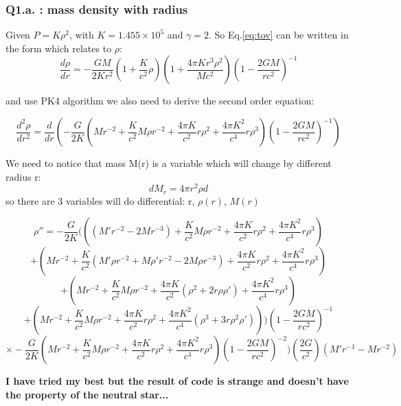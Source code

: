 \documentclass{article}
\begin{document}
\subsubsection*{Q1.a. : mass density with radius}

Given $P=K\rho^2$, with $K=1.455\times 10^5$ and $\gamma=2$.
So Eq.\ref{eq:tov} can be written in the form which relates to $\rho$:
\begin{equation}
    \frac{d\rho}{dr}=
    -\frac{GM}{2Kr^2}
    (1+\frac{K}{c^2}\rho)
    (1+\frac{4\pi K r^3 \rho^2}{Mc^2})
    (1-\frac{2GM}{rc^2})^{-1}
    \label{eq:rho'}
\end{equation}

and use PK4 algorithm we also need to derive the second order equation:

\begin{equation}
    \frac{d^2\rho}{dr^2}=
    \frac{d}{dr}(
    -\frac{G}{2K}
    (Mr^{-2}
    +\frac{K}{c^2} M\rho r^{-2}
    +\frac{4\pi K}{c^2} r\rho^2
    +\frac{4\pi K^2}{c^4} r\rho^3)
    (1-\frac{2GM}{rc^2})^{-1}
    )
    \label{eq:rho''}
\end{equation}

We need to notice that mass M(r) is a variable which will change by different radius r:
$$
dM_r=4\pi r^2 \rho d
$$
so there are 3 variables will do differential: r, $\rho(r)$, $M(r)$

$$
    \rho''=
    -\frac{G}{2K}(((M'r^{-2}-2Mr^{-3})+\frac{K}{c^2} M\rho r^{-2}
    +\frac{4\pi K}{c^2} r\rho^2
    +\frac{4\pi K^2}{c^4} r\rho^3)
$$
$$
    +(Mr^{-2}
    +\frac{K}{c^2} (M'\rho r^{-2}+M\rho 'r^{-2}-2M\rho r^{-3})
    +\frac{4\pi K}{c^2} r\rho^2
    +\frac{4\pi K^2}{c^4} r\rho^3)
$$
$$
    +(Mr^{-2}
    +\frac{K}{c^2} M\rho r^{-2}
    +\frac{4\pi K}{c^2} (\rho^2+2r\rho \rho ')
    +\frac{4\pi K^2}{c^4} r\rho^3)
$$
$$
    +(Mr^{-2}
    +\frac{K}{c^2} M\rho r^{-2}
    +\frac{4\pi K}{c^2} r\rho^2
    +\frac{4\pi K^2}{c^4} (\rho^3+3r\rho ^2 \rho '))
    )
    (1-\frac{2GM}{rc^2})^{-1}
$$
$$
    \times -\frac{G}{2K}
    (Mr^{-2}
    +\frac{K}{c^2} M\rho r^{-2}
    +\frac{4\pi K}{c^2} r\rho^2
    +\frac{4\pi K^2}{c^4} r\rho^3)
    (1-\frac{2GM}{rc^2})^{-2}
    )
    (\frac{2G}{c^2})(M'r^{-1}-Mr^{-2})
$$

\textbf{I have tried my best but the result of code is strange and doesn't have the property of the neutral star...}
\end{document}
